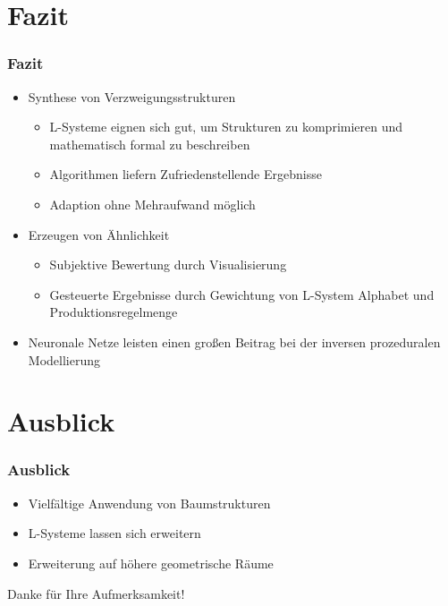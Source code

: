 \documentclass[12pt]{beamer}
\begin{document}
    \section{Fazit}
    \label{sec:fazit}
    \begin{frame}
        \frametitle{Fazit}

        \begin{itemize}
            \setlength\itemsep{1em}
            \item<1-> Synthese von Verzweigungsstrukturen
            \begin{itemize}
                \setlength\itemsep{1em}
                \item L-Systeme eignen sich gut, um Strukturen zu komprimieren und mathematisch formal zu beschreiben
                \item Algorithmen liefern Zufriedenstellende Ergebnisse
                \item Adaption ohne Mehraufwand möglich
            \end{itemize}
            \item<2-> Erzeugen von Ähnlichkeit
            \begin{itemize}
                \setlength\itemsep{1em}
                \item Subjektive Bewertung durch Visualisierung
                \item Gesteuerte Ergebnisse durch Gewichtung von L-System Alphabet und Produktionsregelmenge
            \end{itemize}
            \item<3-> Neuronale Netze leisten einen großen Beitrag bei der inversen prozeduralen Modellierung
        \end{itemize}
    \end{frame}

    \section{Ausblick}
    \label{sec:ausblick}
    \begin{frame}
        \frametitle{Ausblick}

        \begin{itemize}
            \setlength\itemsep{1em}
            \item<1-> Vielfältige Anwendung von Baumstrukturen
            \item<2-> L-Systeme lassen sich erweitern
            \item<3-> Erweiterung auf höhere geometrische Räume
        \end{itemize}
    \end{frame}

    \begin{frame}
        \begin{center}
            Danke für Ihre Aufmerksamkeit!
        \end{center}
    \end{frame}
\end{document}
